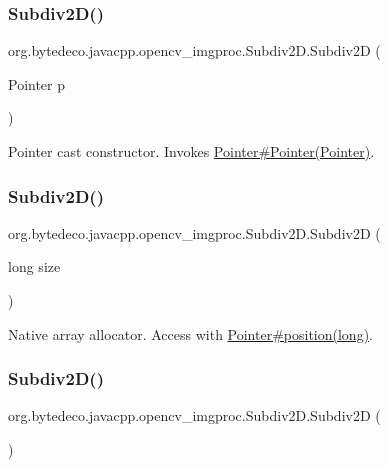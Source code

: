 \subsubsection{\texorpdfstring{Subdiv2\+D()}{Subdiv2D()}\hspace{0.1cm}{\footnotesize\ttfamily [1/4]}}
{\footnotesize\ttfamily org.\+bytedeco.\+javacpp.\+opencv\+\_\+imgproc.\+Subdiv2\+D.\+Subdiv2D (\begin{DoxyParamCaption}\item[{Pointer}]{p }\end{DoxyParamCaption})\hspace{0.3cm}{\ttfamily [inline]}}

Pointer cast constructor. Invokes \hyperlink{}{Pointer\#\+Pointer(\+Pointer)}. \mbox{\label{group__imgproc_ga3b06b65ff3cb26053cb1cea3a2dc3a0c}} 
\subsubsection{\texorpdfstring{Subdiv2\+D()}{Subdiv2D()}\hspace{0.1cm}{\footnotesize\ttfamily [2/4]}}
{\footnotesize\ttfamily org.\+bytedeco.\+javacpp.\+opencv\+\_\+imgproc.\+Subdiv2\+D.\+Subdiv2D (\begin{DoxyParamCaption}\item[{long}]{size }\end{DoxyParamCaption})\hspace{0.3cm}{\ttfamily [inline]}}

Native array allocator. Access with \hyperlink{}{Pointer\#position(long)}. \mbox{\label{group__imgproc_gae59447279a4317ac1ec79b5c0f3b8f4d}} 
\subsubsection{\texorpdfstring{Subdiv2\+D()}{Subdiv2D()}\hspace{0.1cm}{\footnotesize\ttfamily [3/4]}}
{\footnotesize\ttfamily org.\+bytedeco.\+javacpp.\+opencv\+\_\+imgproc.\+Subdiv2\+D.\+Subdiv2D (\begin{DoxyParamCaption}{ }\end{DoxyParamCaption})\hspace{0.3cm}{\ttfamily [inline]}}

